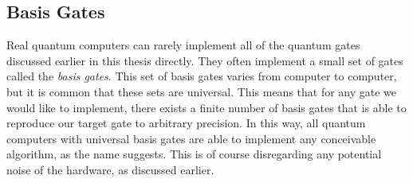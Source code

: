 \subsection{Basis Gates}\label{sec:Basis Gates}
Real quantum computers can rarely implement all of the quantum gates discussed earlier in this thesis directly. They often implement a small set of gates called the \emph{basis gates}. This set of basis gates varies from computer to computer, but it is common that these sets are universal. This means that for any gate we would like to implement, there exists a finite number of basis gates that is able to reproduce our target gate to arbitrary precision. In this way, all quantum computers with universal basis gates are able to implement any conceivable algorithm, as the name suggests. This is of course disregarding any potential noise of the hardware, as discussed earlier. 




